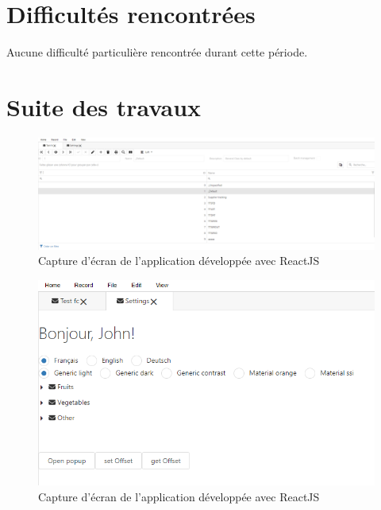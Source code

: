 \documentclass[a4paper, 12pt, french]{article}
\begin{document}
	\section{Difficultés rencontrées}
		Aucune difficulté particulière rencontrée durant cette période.

	\newpage
	
	\section{Suite des travaux}
		\begin{figure}[h!]
			\includegraphics[width=\linewidth]{mph_web_reactts_aout_1.png}
			\caption{Capture d'écran de l'application développée avec ReactJS}
		\end{figure}
		\begin{figure}[h!]
			\includegraphics[width=\linewidth]{mph_web_reactts_aout_2.png}
			\caption{Capture d'écran de l'application développée avec ReactJS}
		\end{figure}
		
		\newpage
		
\end{document}
